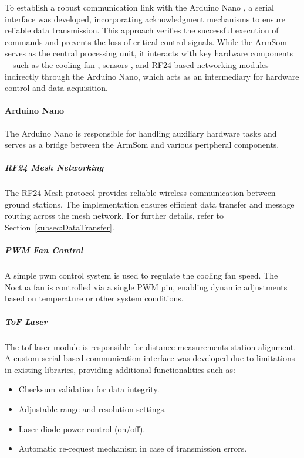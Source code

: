 To establish a robust communication link with the Arduino Nano \cite{arduino_nano_dfrobot}, a serial interface was developed, incorporating acknowledgment mechanisms to ensure reliable data transmission. This approach verifies the successful execution of commands and prevents the loss of critical control signals. While the ArmSom serves as the central processing unit, it interacts with key hardware components—such as the cooling fan \cite{noctua_fan_nf_a8}, sensors \cite{azdelivery_gy_271, azdelivery_gy_521, indusky_microswitch}, and RF24-based networking modules \cite{nRF24L01, nRF24L01_plus}—indirectly through the Arduino Nano, which acts as an intermediary for hardware control and data acquisition.

\paragraph{Arduino Nano}
The Arduino Nano \cite{arduino_nano_dfrobot} is responsible for handling auxiliary hardware tasks and serves as a bridge between the ArmSom \cite{armsom_sige7} and various peripheral components.

\subparagraph{RF24 Mesh Networking}
The RF24 Mesh protocol provides reliable wireless communication between ground stations. The implementation ensures efficient data transfer and message routing across the mesh network. For further details, refer to Section~\ref{subsec:DataTransfer}.

\subparagraph{PWM Fan Control}
A simple \acrshort{pwm} control system is used to regulate the cooling fan speed. The Noctua fan \cite{noctua_fan_nf_a8} is controlled via a single PWM pin, enabling dynamic adjustments based on temperature or other system conditions.

\subparagraph{ToF Laser}
The \acrshort{tof} laser module \cite{dfrobot_ir_sensor} is responsible for distance measurements station alignment. A custom serial-based communication interface was developed due to limitations in existing libraries, providing additional functionalities such as:
\begin{itemize}
	\item Checksum validation for data integrity.
	\item Adjustable range and resolution settings.
	\item Laser diode power control (on/off).
	\item Automatic re-request mechanism in case of transmission errors.
\end{itemize}

